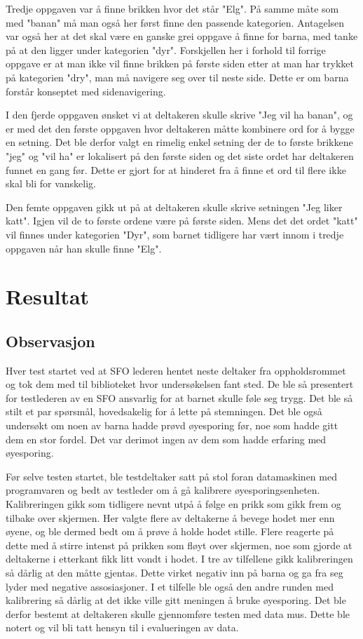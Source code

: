  
Tredje oppgaven var å finne brikken hvor det står "Elg". På samme måte som med "banan" må man også her først finne den passende kategorien. Antagelsen var også her at det skal være en ganske grei oppgave å finne for barna, med tanke på at den ligger under kategorien "dyr". Forskjellen her i forhold til forrige oppgave er at man ikke vil finne brikken på første siden etter at man har trykket på kategorien "dry", man må navigere seg over til neste side. Dette er om barna forstår konseptet med sidenavigering.
 
 
I den fjerde oppgaven ønsket vi at deltakeren skulle skrive "Jeg vil ha banan", og er med det den første oppgaven hvor deltakeren måtte kombinere ord for å bygge en setning. Det ble derfor valgt en rimelig enkel setning der de to første brikkene "jeg" og "vil ha" er lokalisert på den første siden og det siste ordet har deltakeren funnet en gang før. Dette er gjort for at hinderet fra å finne et ord til flere ikke skal bli for vanskelig.  
 
 
Den femte oppgaven gikk ut på at deltakeren skulle skrive setningen "Jeg liker katt". Igjen vil de to første ordene være på første siden. Mens det det ordet "katt" vil finnes under kategorien "Dyr", som barnet tidligere har vært innom i tredje oppgaven når han skulle finne "Elg". 
 
 
\section{Resultat} 
 
 
\subsection{Observasjon} 
 
 
Hver test startet ved at SFO lederen hentet neste deltaker fra oppholdsrommet og tok dem med til biblioteket hvor undersøkelsen fant sted. De ble så presentert for testlederen av en SFO ansvarlig for at barnet skulle føle seg trygg. Det ble så stilt et par spørsmål, hovedsakelig for å lette på stemningen. Det ble også undersøkt om noen av barna hadde prøvd øyesporing før, noe som hadde gitt dem en stor fordel. Det var derimot ingen av dem som hadde erfaring med øyesporing. 
 
 
Før selve testen startet, ble testdeltaker satt på stol foran datamaskinen med programvaren og bedt av testleder om å gå kalibrere øyesporingsenheten. Kalibreringen gikk som tidligere nevnt utpå å følge en prikk som gikk frem og tilbake over skjermen. Her valgte flere av deltakerne å bevege hodet mer enn øyene, og ble dermed bedt om å prøve å holde hodet stille. Flere reagerte på dette med å stirre intenst på prikken som fløyt over skjermen, noe som gjorde at deltakerne i etterkant fikk litt vondt i hodet. I tre av tilfellene gikk kalibreringen så dårlig at den måtte gjentas. Dette virket negativ inn på barna og ga fra seg lyder med negative assosiasjoner. I et tilfelle ble også den andre runden med kalibrering så dårlig at det ikke ville gitt meningen å bruke øyesporing. Det ble derfor bestemt at deltakeren skulle gjennomføre testen med data mus. Dette ble notert og vil bli tatt hensyn til i evalueringen av data. 
 
